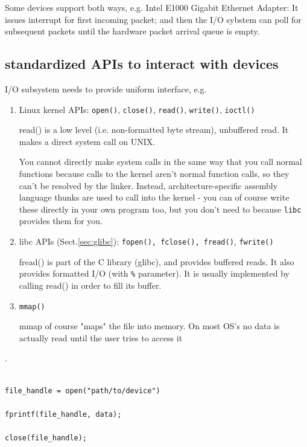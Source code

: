 Some devices support both ways, e.g. Intel E1000 Gigabit Ethernet Adapter:
It issues interrupt for first incoming packet; and then the I/O sybstem can poll
for subsequent packets until the hardware packet arrival queue is empty.


\subsection{standardized APIs to interact with devices}

I/O subsystem needs to provide uniform interface, e.g.
\begin{enumerate}
  \item  Linux kernel APIs: 
  \verb!open()!, \verb!close()!, \verb!read()!,
  \verb!write()!, \verb!ioctl()!

read() is a low level (i.e. non-formatted byte stream), unbuffered read. It
makes a direct system call on UNIX.


You cannot directly make system calls in the same way that you call normal
functions because calls to the kernel aren't normal function calls, so they
can't be resolved by the linker. Instead, architecture-specific assembly
language thunks are used to call into the kernel - you can of course write these
directly in your own program too, but you don't need to because \verb!libc!
provides them for you.

  \item libc APIs (Sect.\ref{sec:glibc}): \verb!fopen(), fclose(), fread()!,
  \verb!fwrite()!
  
fread() is part of the C library (glibc), and provides buffered reads. It also
provides formatted I/O (with \verb!%! parameter). It is usually implemented by
calling read() in order to fill its buffer.




  \item \verb!mmap()! 

mmap of course "maps" the file into memory. On most OS's no data is actually
read until the user tries to access it

\end{enumerate}.

\begin{verbatim}

file_handle = open("path/to/device")

fprintf(file_handle, data); 

close(file_handle);
\end{verbatim}

